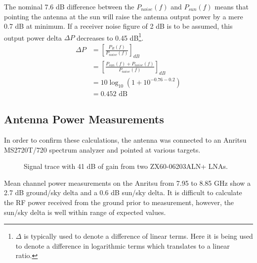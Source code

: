 \documentclass[titlepage]{article}
\begin{document}
The nominal 7.6 dB difference between the $P_{noise}(f)$ and $P_{sun}(f)$ means that pointing the antenna at the sun will raise the antenna output power by a mere 0.7 dB at minimum. If a receiver noise figure of 2 dB is to be assumed, this output power delta $\Delta P$ decreases to 0.45 dB\footnote{$\Delta$ is typically used to denote a difference of linear terms. Here it is being used to denote a difference in logarithmic terms which translates to a linear ratio.}.
\begin{align*}
    \Delta P &= \left[ \frac{P_{R}(f)}{P_{noise}(f)} \right] _{dB}\\
             &= \left[ \frac{P_{sun}(f)+P_{noise}(f)}{P_{noise}(f)} \right] _{dB}\\
             &= 10 \log_{10} \left( 1 + 10^{-0.76 - 0.2} \right)\\
             &= 0.452 \text{ dB}
\end{align*}


\subsection{Antenna Power Measurements}
\label{sec:pwrplots}
In order to confirm these calculations, the antenna was connected to an Anritsu MS2720T/720 spectrum analyzer and pointed at various targets.
\begin{figure}[H]
\begin {center}
\caption{Signal trace with 41 dB of gain from two ZX60-06203ALN+ LNAs.}\label{fig:specan1}
\end {center}
\end{figure}
Mean channel power measurements on the Anritsu from 7.95 to 8.85 GHz show a 2.7 dB ground/sky delta and a 0.6 dB sun/sky delta. It is difficult to calculate the RF power received from the ground prior to measurement, however, the sun/sky delta is well within range of expected values.
\end{document}

